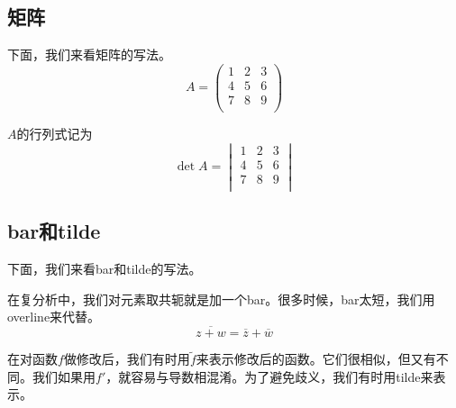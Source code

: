 \subsection{矩阵}
下面，我们来看矩阵的写法。
\[  A=\begin{pmatrix}
1&2&3\\
4&5&6\\
7&8&9\\
\end{pmatrix}\]

$A$的行列式记为
\[ \det A=\begin{vmatrix}
1&2&3\\
4&5&6\\
7&8&9\\
\end{vmatrix} \]

\subsection{bar和tilde}
下面，我们来看bar和tilde的写法。

在复分析中，我们对元素取共轭就是加一个bar。很多时候，bar太短，我们用overline来代替。
\[  \overline{z+w}=\overline{z}+\overline{w} \]

在对函数$f$做修改后，我们有时用$\tilde{f}$来表示修改后的函数。它们很相似，但又有不同。我们如果用$f'$，就容易与导数相混淆。为了避免歧义，我们有时用tilde来表示。